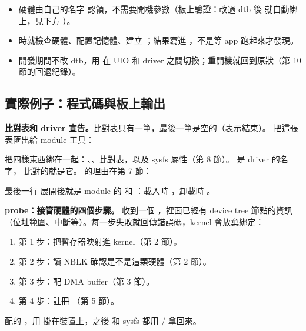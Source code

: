 \begin{gain}
\begin{itemize}
\item 硬體由自己的名字  認領，不需要開機參數（板上驗證：改過 dtb 後  就自動綁上，見下方 ）。
\item {} 時就檢查硬體、配置記憶體、建立 ；結果寫進 ，不是等 app 跑起來才發現。
\item 開發期間不改 dtb，用  在 UIO 和 driver 之間切換；重開機就回到原狀（第 10 節的回退紀錄）。
\end{itemize}
\end{gain}

\subsection{實際例子：程式碼與板上輸出}

\textbf{比對表和 driver 宣告。}比對表只有一筆，最後一筆是空的（表示結束）。 把這張表匯出給 module 工具：


 把四樣東西綁在一起：、、比對表，以及 sysfs 屬性（第 8 節）。 是 driver 的名字， 比對的就是它。 的理由在第 7 節：


最後一行  展開後就是 module 的  和 ：載入時 ，卸載時 。

\textbf{probe：接管硬體的四個步驟。} 收到一個 ，裡面已經有 device tree 節點的資訊（位址範圍、中斷等）。每一步失敗就回傳錯誤碼，kernel 會放棄綁定：


\begin{enumerate}
\item 第 1 步：把暫存器映射進 kernel（第 2 節）。
\item 第 2 步：讀 NBLK 確認是不是這顆硬體（第 2 節）。
\item 第 3 步：配 DMA buffer（第 3 節）。
\item 第 4 步：註冊 （第 5 節）。
\end{enumerate}

 配的 ，用  掛在裝置上，之後  和 sysfs 都用  /  拿回來。

